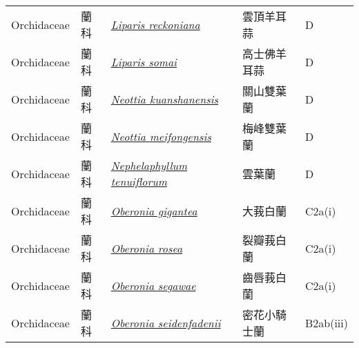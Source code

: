 {\begin{longtable}{L{2.5cm}L{2cm}L{5cm}L{2.5cm}L{3cm}}
    Orchidaceae & 蘭科 & \href{http://www.theplantlist.org/tpl1.1/search?q=Liparis+reckoniana}{\textit{Liparis reckoniana} } & 雲頂羊耳蒜 & D    \\
    Orchidaceae & 蘭科 & \href{http://www.theplantlist.org/tpl1.1/search?q=Liparis+somai}{\textit{Liparis somai} } & 高士佛羊耳蒜 & D    \\
    Orchidaceae & 蘭科 & \href{http://www.theplantlist.org/tpl1.1/search?q=Neottia+kuanshanensis}{\textit{Neottia kuanshanensis} } & 關山雙葉蘭 & D    \\
    Orchidaceae & 蘭科 & \href{http://www.theplantlist.org/tpl1.1/search?q=Neottia+meifongensis}{\textit{Neottia meifongensis} } & 梅峰雙葉蘭 & D    \\
    Orchidaceae & 蘭科 & \href{http://www.theplantlist.org/tpl1.1/search?q=Nephelaphyllum+tenuiflorum}{\textit{Nephelaphyllum tenuiflorum} } & 雲葉蘭 & D    \\
    Orchidaceae & 蘭科 & \href{http://www.theplantlist.org/tpl1.1/search?q=Oberonia+gigantea}{\textit{Oberonia gigantea} } & 大莪白蘭 & C2a(i)    \\
    Orchidaceae & 蘭科 & \href{http://www.theplantlist.org/tpl1.1/search?q=Oberonia+rosea}{\textit{Oberonia rosea} } & 裂瓣莪白蘭 & C2a(i)    \\
    Orchidaceae & 蘭科 & \href{http://www.theplantlist.org/tpl1.1/search?q=Oberonia+segawae}{\textit{Oberonia segawae} } & 齒唇莪白蘭 & C2a(i)    \\
    Orchidaceae & 蘭科 & \href{http://www.theplantlist.org/tpl1.1/search?q=Oberonia+seidenfadenii}{\textit{Oberonia seidenfadenii} } & 密花小騎士蘭 & B2ab(iii)    \\

\end{longtable}}
